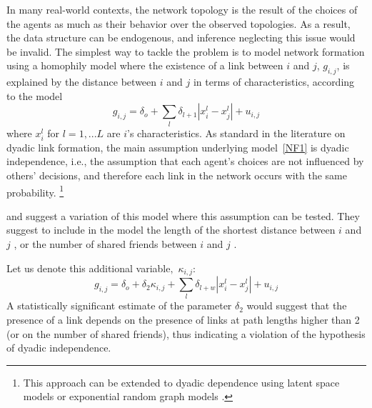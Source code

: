 \documentclass[nojss]{jss}
\begin{document}
In many real-world contexts, the network topology is the result of the choices of the agents as much as their behavior over the observed topologies. As a result, the data structure can be endogenous, and inference neglecting this issue would be invalid. The simplest way to tackle the problem is to model network formation using a homophily model \cite[see e.g.,][]{Fafchamps+Gubert:2007,Mayer+Puller:2008,Lai+Reiter:2017,Apicella+Marlowe+Fowler+Christakis:2012,Attanasio+Barr+Cardenas+Genicot+Meghir:2012} where the existence of a link between $i$ and $j$, $g_{i,j}$, is explained by the distance between $i$ and $j$ in terms of characteristics, according to the model
\begin{equation}
g_{i,j}=\delta _{o}+\sum_{l}\delta _{l+1}|x_{i}^{l}-x_{j}^{l}|+u_{i,j}
\label{NF1}
\end{equation}
where $x_{i}^{l}$ for $l=1,...L$ are $i$'s characteristics. As standard in the literature on dyadic link formation, the main assumption underlying model~\ref{NF1} is dyadic independence, i.e., the assumption that each agent's choices are not influenced by others' decisions, and therefore each link in the network occurs with the same probability. \footnote{This approach can be extended to dyadic dependence using latent space models or exponential random graph models \citep[see][for a discussion]{An:2011}.} 

\cite{Fafchamps+Leij+Goyal:2010} and \cite{Graham:2015} suggest a variation of this model where this assumption can be tested. They suggest to include in the model the length of the shortest distance between $i$ and $j$ \citep{Fafchamps+Leij+Goyal:2010}, or the number of shared friends between $i$ and $j$ \citep{Graham:2015}.

Let us denote this additional variable$,$ $\kappa _{i,j}$:
\begin{equation}
g_{i,j}=\delta _{o}+\delta _{2}\kappa _{i,j}+\sum_{l}\delta
_{l+w}|x_{i}^{l}-x_{j}^{l}|+u_{i,j}  
\label{NF2}
\end{equation}
A statistically significant estimate of the parameter $\delta _{2}$ would suggest that the presence of a link depends on the presence of links at path lengths higher than 2 (or on the number of shared friends), thus indicating a violation of the hypothesis of dyadic independence.
\end{document}
